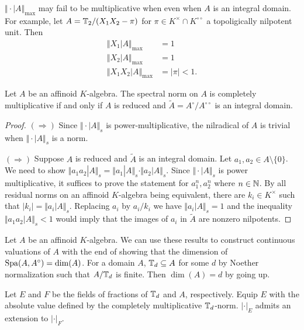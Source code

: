 \begin{example}
    $\Vert\cdot|A\Vert_{\max}$ may fail to be multiplicative when even when $A$ is an integral domain. For example,
    let $A=\mathbb{T}_{2}/(X_{1}X_{2}-\pi)$ for $\pi\in K^{\times}\cap K^{\circ\circ}$ a topoligically nilpotent unit. Then 
    \begin{align*}
        \Vert X_{1}|A\Vert_{\max}&=1 \\
        \Vert X_{2}|A\Vert_{\max}&=1 \\
        \Vert X_{1}X_{2}|A\Vert_{\max} &= |\pi|<1.
    \end{align*}
\end{example}
\begin{proposition}\label{prop: multiplicative iff reduced}
    Let $A$ be an affinoid $K$-algebra. The spectral norm on $A$ is completely multiplicative if and only if $A$ is reduced and $\widetilde{A}=A^{\circ}/A^{\circ\circ}$ is an integral domain. 
\end{proposition}
\begin{proof}
    $(\Rightarrow)$ Since $\Vert\cdot|A\Vert_{s}$ is power-multiplicative, the nilradical of $A$ is trivial when $\Vert\cdot|A\Vert_{s}$ is a norm. 

    $(\Rightarrow)$ Suppose $A$ is reduced and $\widetilde{A}$ is an integral domain. Let $a_{1},a_{2}\in A\setminus\{0\}$. We need to show $\Vert a_{1}a_{2}|A\Vert_{s}=\Vert a_{1}|A\Vert_{s}\cdot\Vert a_{2}|A\Vert_{s}$. Since $\Vert\cdot|A\Vert_{s}$ is power multiplicative, it suffices to prove the statement for $a_{1}^{n},a_{2}^{n}$ where $n\in\mathbb{N}$. By all residual norms on an affinoid $K$-algebra being equivalent, there are $k_{i}\in K^{\times}$ such that $|k_{i}|=\Vert a_{i}|A\Vert_{s}$. Replacing $a_{i}$ by $a_{i}/k_{i}$ we have $\Vert a_{i}|A\Vert_{s}=1$ and the inequality $\Vert a_{1}a_{2}|A\Vert_{s}<1$ would imply that the images of $a_{i}$ in $\widetilde{A}$ are nonzero nilpotents. 
\end{proof}
\begin{remark}
    Let $A$ be an affinoid $K$-algebra. We can use these results to construct continuous valuations of $A$ with the end of showing that the dimension of $\mathrm{Spa}(A,A^{\circ})=\dim(A)$. For a domain $A$, $\mathbb{T}_{d}\subseteq A$ for some $d$ by Noether normalization such that $A/\mathbb{T}_{d}$ is finite. Then $\dim(A)=d$ by going up. 
\end{remark} %
Let $E$ and $F$ be the fields of fractions of $\mathbb{T}_{d}$ and $A$, respectively. Equip $E$ with the absolute value defined by the completely multiplicative $\mathbb{T}_{d}$-norm. $|\cdot|_{E}$ admits an extension to $|\cdot|_{F}$. 
